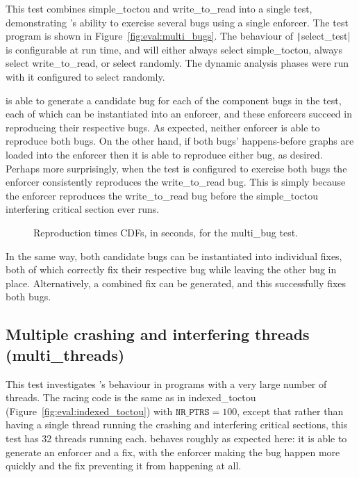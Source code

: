 This test combines simple\_toctou and write\_to\_read into a single
test, demonstrating {\technique}'s ability to exercise several bugs
using a single enforcer.  The test program is shown in
Figure~\ref{fig:eval:multi_bugs}.  The behaviour of
\texttt|select\_test| is configurable at run time, and will either
always select simple\_toctou, always select write\_to\_read, or select
randomly.  The dynamic analysis phases were run with it configured to
select randomly.

{\Implementation} is able to generate a candidate bug for each of the
component bugs in the test, each of which can be instantiated into an
enforcer, and these enforcers succeed in reproducing their respective
bugs.  As expected, neither enforcer is able to reproduce both bugs.
On the other hand, if both bugs' happens-before graphs are loaded into
the enforcer then it is able to reproduce either bug, as desired.
Perhaps more surprisingly, when the test is configured to exercise
both bugs the enforcer consistently reproduces the write\_to\_read
bug.  This is simply because the enforcer reproduces the
write\_to\_read bug before the simple\_toctou interfering critical
section ever runs.

\begin{figure}
  
  \caption{Reproduction times CDFs, in seconds, for the multi\_bug
    test.}
\end{figure}

In the same way, both candidate bugs can be instantiated into
individual fixes, both of which correctly fix their respective bug
while leaving the other bug in place.  Alternatively, a combined fix
can be generated, and this successfully fixes both bugs.

\subsection{Multiple crashing and interfering threads (multi\_threads)}

This test investigates {\implementation}'s behaviour in programs with
a very large number of threads.  The racing code is the same as in
indexed\_toctou (Figure~\ref{fig:eval:indexed_toctou}) with
$\texttt{NR\_PTRS} = 100$, except that rather than having a single
thread running the crashing and interfering critical sections, this
test has 32 threads running each.  {\Technique} behaves roughly as
expected here: it is able to generate an enforcer and a fix, with the
enforcer making the bug happen more quickly and the fix preventing it
from happening at all.

